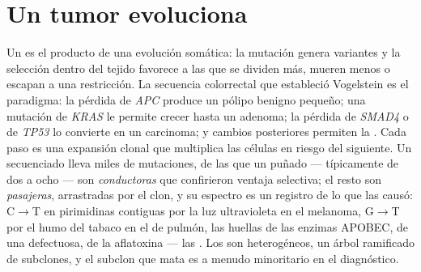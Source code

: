 \section{Un tumor evoluciona}

\begin{proposition}\label{prop:b3:cancer-biology:multistep}
Un  es el producto de una evolución somática: la mutación genera
variantes y la selección dentro del tejido favorece a las que se dividen
más, mueren menos o escapan a una restricción. La secuencia colorrectal
que estableció Vogelstein es el paradigma: la pérdida de \emph{APC}
produce un pólipo benigno pequeño; una mutación de \emph{KRAS} le permite
crecer hasta un adenoma; la pérdida de \emph{SMAD4} o de \emph{TP53} lo
convierte en un carcinoma; y cambios posteriores permiten la .
Cada paso es una expansión clonal que multiplica las células en riesgo
del siguiente. Un  secuenciado lleva miles de mutaciones, de las que
un puñado --- típicamente de dos a ocho --- son \emph{conductoras} que
confirieron ventaja selectiva; el resto son \emph{pasajeras},
arrastradas por el clon, y su espectro es un registro de lo que las
causó: C$\to$T en pirimidinas contiguas por la luz ultravioleta en el
melanoma, G$\to$T por el humo del tabaco en el  de pulmón, las
huellas de las enzimas APOBEC, de una  defectuosa, de la aflatoxina --- las \emph{}. Los  son heterogéneos, un árbol ramificado de
subclones, y el subclon que mata es a menudo minoritario en el
diagnóstico.
\end{proposition}

